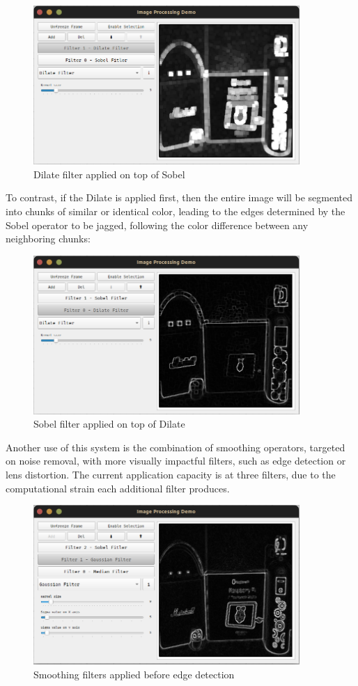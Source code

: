 \begin{figure}[H]
	\includegraphics[width=0.9\textwidth, height=0.45\textwidth]{resources/Layers_1.png}
	\caption{Dilate filter applied on top of Sobel}
\end{figure}

To contrast, if the Dilate is applied first, then the entire image will be segmented into chunks of similar
or identical color, leading to the edges determined by the Sobel operator to be jagged, following the color
difference between any neighboring chunks:

\begin{figure}[H]
	\includegraphics[width=0.9\textwidth, height=0.45\textwidth]{resources/Layers_2.png}
	\caption{Sobel filter applied on top of Dilate}
\end{figure}

Another use of this system is the combination of smoothing operators, targeted on noise removal, with more
visually impactful filters, such as edge detection or lens distortion. The current application capacity is
at three filters, due to the computational strain each additional filter produces.

\begin{figure}[H]
	\includegraphics[width=0.9\textwidth, height=0.45\textwidth]{resources/Layers_3.png}
	\caption{Smoothing filters applied before edge detection}
\end{figure}

